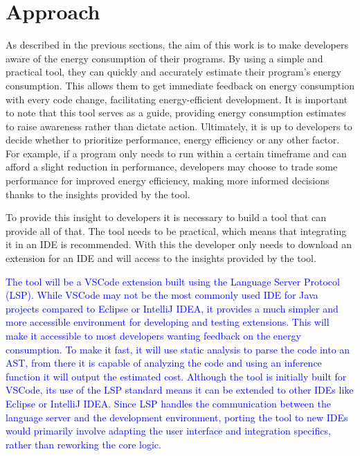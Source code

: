 \usepackage{xcolor}

\usepackage[most]{tcolorbox}
\usepackage{minted}
\usepackage{placeins}
\usepackage{float}



\chapter{Approach}\label{chapter:approach}

As described in the previous sections, the aim of this work is to make developers aware of the energy consumption of their programs. By using a simple and practical tool, they can quickly and accurately estimate their program's energy consumption. This allows them to get immediate feedback on energy consumption with every code change, facilitating energy-efficient development. It is important to note that this tool serves as a guide, providing energy consumption estimates to raise awareness rather than dictate action. Ultimately, it is up to developers to decide whether to prioritize performance, energy efficiency or any other factor. For example, if a program only needs to run within a certain timeframe and can afford a slight reduction in performance, developers may choose to trade some performance for improved energy efficiency, making more informed decisions thanks to the insights provided by the tool.

To provide this insight to developers it is necessary to build a tool that can provide all of that. The tool needs to be practical, which means that integrating it in an IDE is recommended. With this the developer only needs to download an extension for an IDE and will access to the insights provided by the tool.

\textcolor{blue}{
The tool will be a VSCode extension built using the Language Server Protocol (LSP). While VSCode may not be the most commonly used IDE for Java projects compared to Eclipse or IntelliJ IDEA, it provides a much simpler and more accessible environment for developing and testing extensions. This will make it accessible to most developers wanting feedback on the energy consumption. To make it fast, it will use static analysis to parse the code into an AST, from there it is capable of analyzing the code and using an inference function it will output the estimated cost.
Although the tool is initially built for VSCode, its use of the LSP standard means it can be extended to other IDEs like Eclipse or IntelliJ IDEA. Since LSP handles the communication between the language server and the development environment, porting the tool to new IDEs would primarily involve adapting the user interface and integration specifics, rather than reworking the core logic.}


